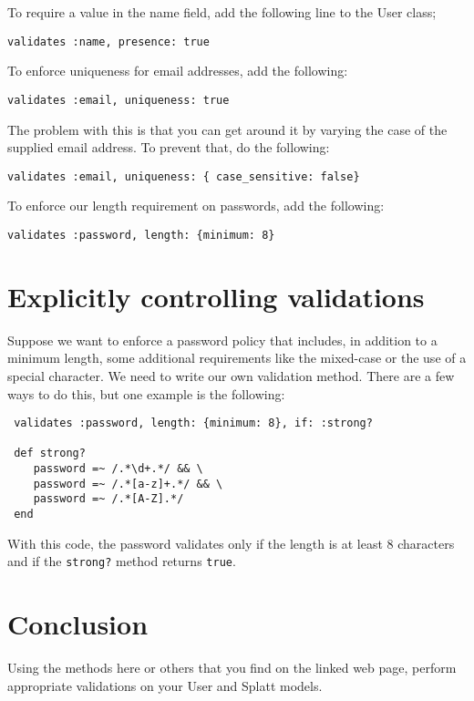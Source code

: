 \documentclass{article}
\begin{document}
To require a value in the name field, add the following line to the User class;

\texttt{validates :name, presence: true}

To enforce uniqueness for email addresses, add the following:


\texttt{validates :email, uniqueness: true }

The problem with this is that you can get around it by varying the case of the supplied email address.  To prevent that, do the following:

\texttt{validates :email, uniqueness: \{ case\_sensitive: false\}  }

\newpage

To enforce our length requirement on passwords, add the following:

\texttt{validates :password, length: \{minimum: 8\} } 

\section{Explicitly controlling validations}
Suppose we want to enforce a password policy that includes, in addition to a minimum length, some additional requirements like the mixed-case or the use of a special character.  We need to write our own validation method.  There are a few ways to do this, but one example is the following:

\begin{verbatim}
 validates :password, length: {minimum: 8}, if: :strong?

 def strong?
    password =~ /.*\d+.*/ && \
    password =~ /.*[a-z]+.*/ && \
    password =~ /.*[A-Z].*/
 end

\end{verbatim}

With this code, the password validates only if the length is at least 8 characters and if the \texttt{strong?} method returns \texttt{true}.

\section{Conclusion}
Using the methods here or others that you find on the linked web page, perform appropriate validations on your User and Splatt models.
\end{document}
